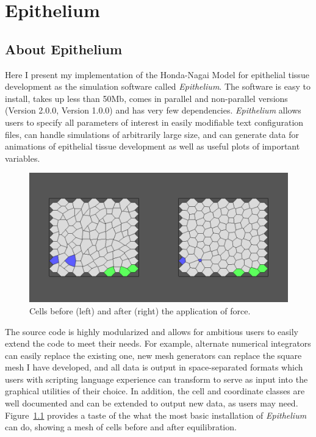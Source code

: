 \chapter{Epithelium}

\section{About Epithelium}
Here I present my implementation of the Honda-Nagai Model for epithelial tissue development as the simulation software called \emph{Epithelium}. The software is easy to install, takes up less than 50Mb, comes in parallel and non-parallel versions (Version 2.0.0, Version 1.0.0) and has very few dependencies. \emph{Epithelium} allows users to specify all parameters of interest in easily modifiable text configuration files, can handle simulations of arbitrarily large size, and can generate data for animations of epithelial tissue development as well as useful plots of important variables. 
\begin{figure}
\centering
\includegraphics[width=\textwidth]{../diagrams/BeforeAfter.png}
\caption{Cells before (left) and after (right) the application of force.}
\label{fig:beforeafter}
\end{figure}
The source code is highly modularized and allows for ambitious users to easily extend the code to meet their needs. For example, alternate numerical integrators can easily replace the existing one, new mesh generators can replace the square mesh I have developed, and all data is output in space-separated formats which users with scripting language experience can transform to serve as input into the graphical utilities of their choice. In addition, the cell and coordinate classes are well documented and can be extended to output new data, as users may need. Figure~\ref{fig:beforeafter} provides a taste of the what the most basic installation of \emph{Epithelium} can do, showing a mesh of cells before and after equilibration.

